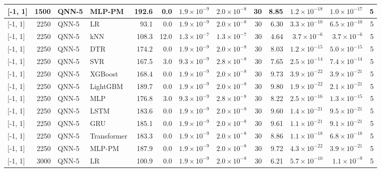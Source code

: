 \begin{longtable}{lrllrrrrrrrrr}
{[-1, 1]} & 1500 & QNN-5 & MLP-PM & 192.6 & 0.0 & $1.9 \times 10^{-9}$ & $2.0 \times 10^{-8}$ & 30 & 8.85 & $1.2 \times 10^{-18}$ & $1.0 \times 10^{-17}$ & 5 \\
\midrule
{[-1, 1]} & 2250 & QNN-5 & LR & 93.1 & 0.0 & $1.9 \times 10^{-9}$ & $2.0 \times 10^{-8}$ & 30 & 6.30 & $3.3 \times 10^{-10}$ & $6.5 \times 10^{-10}$ & 5 \\
{[-1, 1]} & 2250 & QNN-5 & kNN & 108.3 & 12.0 & $1.3 \times 10^{-7}$ & $1.3 \times 10^{-7}$ & 30 & 4.64 & $3.7 \times 10^{-6}$ & $3.7 \times 10^{-6}$ & 5 \\
{[-1, 1]} & 2250 & QNN-5 & DTR & 174.2 & 0.0 & $1.9 \times 10^{-9}$ & $2.0 \times 10^{-8}$ & 30 & 8.03 & $1.2 \times 10^{-15}$ & $5.0 \times 10^{-15}$ & 5 \\
{[-1, 1]} & 2250 & QNN-5 & SVR & 167.5 & 3.0 & $9.3 \times 10^{-9}$ & $2.8 \times 10^{-8}$ & 30 & 7.65 & $2.5 \times 10^{-14}$ & $7.4 \times 10^{-14}$ & 5 \\
{[-1, 1]} & 2250 & QNN-5 & XGBoost & 168.4 & 0.0 & $1.9 \times 10^{-9}$ & $2.0 \times 10^{-8}$ & 30 & 9.73 & $3.9 \times 10^{-22}$ & $3.9 \times 10^{-21}$ & 5 \\
{[-1, 1]} & 2250 & QNN-5 & LightGBM & 189.7 & 0.0 & $1.9 \times 10^{-9}$ & $2.0 \times 10^{-8}$ & 30 & 9.80 & $1.9 \times 10^{-22}$ & $2.1 \times 10^{-21}$ & 5 \\
{[-1, 1]} & 2250 & QNN-5 & MLP & 176.8 & 3.0 & $9.3 \times 10^{-9}$ & $2.8 \times 10^{-8}$ & 30 & 8.22 & $2.5 \times 10^{-16}$ & $1.3 \times 10^{-15}$ & 5 \\
{[-1, 1]} & 2250 & QNN-5 & LSTM & 183.6 & 0.0 & $1.9 \times 10^{-9}$ & $2.0 \times 10^{-8}$ & 30 & 9.60 & $1.4 \times 10^{-21}$ & $9.5 \times 10^{-21}$ & 5 \\
{[-1, 1]} & 2250 & QNN-5 & GRU & 185.1 & 0.0 & $1.9 \times 10^{-9}$ & $2.0 \times 10^{-8}$ & 30 & 9.61 & $1.1 \times 10^{-21}$ & $9.1 \times 10^{-21}$ & 5 \\
{[-1, 1]} & 2250 & QNN-5 & Transformer & 183.3 & 0.0 & $1.9 \times 10^{-9}$ & $2.0 \times 10^{-8}$ & 30 & 8.86 & $1.1 \times 10^{-18}$ & $6.8 \times 10^{-18}$ & 5 \\
{[-1, 1]} & 2250 & QNN-5 & MLP-PM & 187.9 & 0.0 & $1.9 \times 10^{-9}$ & $2.0 \times 10^{-8}$ & 30 & 9.72 & $4.3 \times 10^{-22}$ & $3.9 \times 10^{-21}$ & 5 \\
\midrule
{[-1, 1]} & 3000 & QNN-5 & LR & 100.9 & 0.0 & $1.9 \times 10^{-9}$ & $2.0 \times 10^{-8}$ & 30 & 6.21 & $5.7 \times 10^{-10}$ & $1.1 \times 10^{-9}$ & 5 \\

\end{longtable}
